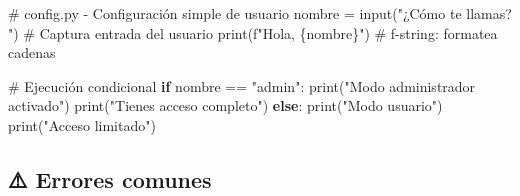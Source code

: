 \documentclass[
  doc,
  floatsintext,
  longtable,
  a4paper,
  nolmodern,
  notxfonts,
  notimes,
  12pt,
  colorlinks=true,linkcolor=blue,citecolor=blue,urlcolor=blue]{apa7}
\newenvironment{Shaded}{\begin{snugshade}}{\end{snugshade}}
\newcommand{\BuiltInTok}[1]{\textcolor[rgb]{0.00,0.23,0.31}{#1}}
\newcommand{\CommentTok}[1]{\textcolor[rgb]{0.37,0.37,0.37}{#1}}
\newcommand{\ControlFlowTok}[1]{\textcolor[rgb]{0.00,0.23,0.31}{\textbf{#1}}}
\newcommand{\NormalTok}[1]{\textcolor[rgb]{0.00,0.23,0.31}{#1}}
\newcommand{\OperatorTok}[1]{\textcolor[rgb]{0.37,0.37,0.37}{#1}}
\newcommand{\SpecialCharTok}[1]{\textcolor[rgb]{0.37,0.37,0.37}{#1}}
\newcommand{\SpecialStringTok}[1]{\textcolor[rgb]{0.13,0.47,0.30}{#1}}
\newcommand{\StringTok}[1]{\textcolor[rgb]{0.13,0.47,0.30}{#1}}
\begin{document}
\begin{Shaded}
\begin{Highlighting}[]
\CommentTok{\# config.py {-} Configuración simple de usuario}
\NormalTok{nombre }\OperatorTok{=} \BuiltInTok{input}\NormalTok{(}\StringTok{"¿Cómo te llamas? "}\NormalTok{)  }\CommentTok{\# Captura entrada del usuario}
\BuiltInTok{print}\NormalTok{(}\SpecialStringTok{f"Hola, }\SpecialCharTok{\{}\NormalTok{nombre}\SpecialCharTok{\}}\SpecialStringTok{"}\NormalTok{)            }\CommentTok{\# f{-}string: formatea cadenas}

\CommentTok{\# Ejecución condicional}
\ControlFlowTok{if}\NormalTok{ nombre }\OperatorTok{==} \StringTok{"admin"}\NormalTok{:}
    \BuiltInTok{print}\NormalTok{(}\StringTok{"Modo administrador activado"}\NormalTok{)}
    \BuiltInTok{print}\NormalTok{(}\StringTok{"Tienes acceso completo"}\NormalTok{)}
\ControlFlowTok{else}\NormalTok{:}
    \BuiltInTok{print}\NormalTok{(}\StringTok{"Modo usuario"}\NormalTok{)}
    \BuiltInTok{print}\NormalTok{(}\StringTok{"Acceso limitado"}\NormalTok{)}
\end{Highlighting}
\end{Shaded}

\subsection{⚠️ Errores comunes}\label{errores-comunes}
\end{document}
